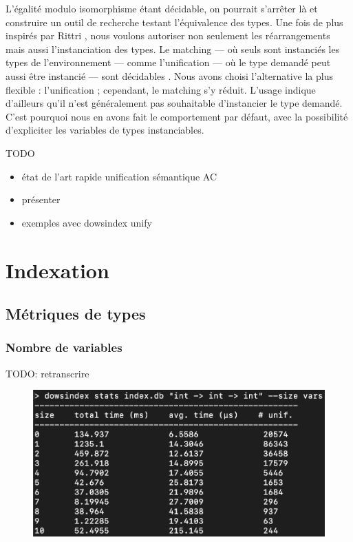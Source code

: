 \documentclass [a4paper] {report}
\theoremstyle {definition}
\begin{document}
L'égalité modulo isomorphisme étant décidable, on pourrait s'arrêter là et construire un outil de recherche testant l'équivalence des types. Une fois de plus inspirés par Rittri \cite {rittri93}, nous voulons autoriser non seulement les réarrangements mais aussi l'instanciation des types. Le matching — où seuls sont instanciés les types de l'environnement — comme l'unification — où le type demandé peut aussi être instancié — sont décidables \cite {narendran_pfenning_statman}. Nous avons choisi l'alternative la plus flexible : l'unification ; cependant, le matching s'y réduit. L'usage indique d'ailleurs qu'il n'est généralement pas souhaitable d'instancier le type demandé. C'est pourquoi nous en avons fait le comportement par défaut, avec la possibilité d'expliciter les variables de types instanciables.

TODO
\begin {itemize}
	\item état de l'art rapide unification sémantique AC
	\item présenter \cite {boudet}
	\item exemples avec dowsindex unify
\end {itemize}


\chapter {Indexation}

\section {Métriques de types}

\subsection {Nombre de variables}

TODO: retranscrire
\begin {figure} [h]
\begin {center}
	\includegraphics [scale=0.2] {images/stats1}
\end {center}
\end {figure}
\end{document}
